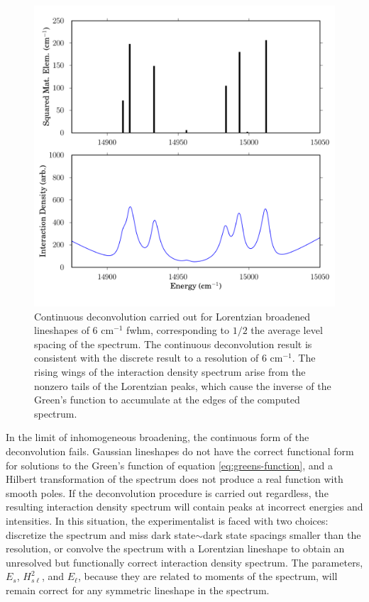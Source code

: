 \begin{figure}
  \caption{Continuous deconvolution carried out for Lorentzian
    broadened lineshapes of 6 cm$^{-1}$ fwhm, corresponding to $1/2$
    the average level spacing of the spectrum.  The continuous
    deconvolution result is consistent with the discrete result to a
    resolution of 6 cm$^{-1}$.  The rising wings of the interaction
    density spectrum arise from the nonzero tails of the Lorentzian
    peaks, which cause the inverse of the Green's function to
    accumulate at the edges of the computed spectrum.}
  \label{fig:broadened}
  \centering
  \includegraphics[width=6in]{smalley-compare-fwhm6.png}
\end{figure}

In the limit of inhomogeneous broadening, the continuous form of the
deconvolution fails.  Gaussian lineshapes do not have the correct
functional form for solutions to the Green's function of equation
\ref{eq:greens-function}, and a Hilbert transformation of the spectrum
does not produce a real function with smooth poles.  If the
deconvolution procedure is carried out regardless, the resulting
interaction density spectrum will contain peaks at incorrect energies
and intensities.  In this situation, the experimentalist is faced with
two choices: discretize the spectrum and miss dark state$\sim$dark
state spacings smaller than the resolution, or convolve the spectrum
with a Lorentzian lineshape to obtain an unresolved but functionally
correct interaction density spectrum.  The parameters, $E_s$,
$H_{s\ell}^2$, and $E_{\ell}$, because they are related to moments of
the spectrum, will remain correct for any symmetric lineshape in the
spectrum.

